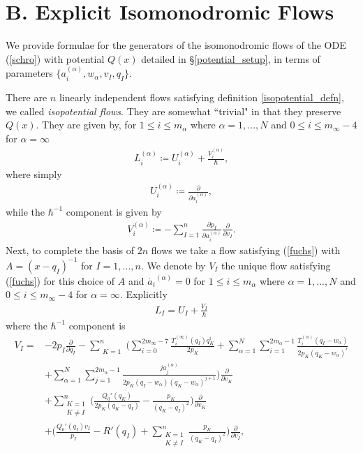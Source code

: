 \documentclass[a4paper,12pt,reqno]{amsart}
\numberwithin{equation}{section}
\numberwithin{counter2}{section}
\begin{document}
\section{B.  Explicit Isomonodromic Flows} \label{explicit_flows}
We provide formulae for the generators of the isomonodromic flows of the ODE (\ref{schro}) with potential $Q(x)$ detailed in \S \ref{potential_setup},  in terms of parameters $\{a_i^{(\alpha)},w_\alpha,  v_I,  q_{I}\}$.  \par
There are $n$ linearly independent flows satisfying definition \ref{isopotential_defn},  we called \textit{isopotential flows}.  They are somewhat ``trivial" in that they preserve $Q(x)$.  They are given by,  for $1 \le i \le m_\alpha$ where $\alpha = 1,...,N$ and $0 \le i \le m_\infty - 4$ for $\alpha = \infty$
\begin{align}
L_{i}^{(\alpha)} \coloneqq U_{i}^{(\alpha)} + \frac{V_{i}^{(\alpha)}}{\hbar},  
\end{align}
where simply
\begin{align}
U_{i}^{(\alpha)}  \coloneqq \frac{\partial}{\partial a_i^{(\alpha)}},  
\end{align}
while the $\hbar^{-1}$ component is given by 
\begin{align}
V_{i}^{(\alpha)} \coloneqq - \sum_{I=1}^{n} \frac{\partial p_I}{\partial a_i^{(\alpha)}} \frac{\partial}{\partial v_I}.  
\end{align}
Next,  to complete the basis of $2n$ flows we take a flow satisfying (\ref{fuchs}) with $A = (x-q_I)^{-1}$ for $I = 1,...,n$.  We denote by $V_I$ the unique flow satisfying (\ref{fuchs}) for this choice of $A$ and $\dot{a_i}^{(\alpha)}=0$ for $1 \le i \le m_\alpha$ where $\alpha = 1,...,N$ and $0 \le i \le m_\infty - 4$ for $\alpha = \infty$.  Explicitly
\begin{align}
L_I = U_I + \frac{V_I}{\hbar}
\end{align}
where the $\hbar^{-1}$ component is
\begin{align}
V_I = &-2p_I\frac{\partial}{\partial q_I} - \sum_{\substack{K=1}}^n\Bigg( \sum_{i=0}^{2m_\infty-7}\frac{T_i^{(\infty)}(q_I)q_K^i}{2p_K} +  \sum_{\alpha=1}^{N}\sum_{i=1}^{2m_\alpha-1}\frac{T_i^{(\alpha)}(q_I-w_\alpha)}{2p_K(q_K-w_\alpha)^{i}} \nonumber \\ &+  \sum_{\alpha=1}^{N} \sum_{j=1}^{2m_\alpha-1} \frac{ja_{j}^{(\alpha)}}{2p_K(q_I-w_\alpha)(q_K-w_\alpha)^{j+1}} \Bigg)\frac{\partial}{\partial v_K} \\ &+ \sum_{\substack{K=1 \\ K \ne I}}^n \Bigg(\frac{Q_0'(q_K)}{2p_K(q_K-q_I)}-\frac{p_K}{(q_K-q_I)^2}\Bigg)\frac{\partial}{\partial v_K} \nonumber \\ &+ \Bigg( \frac{Q_0'(q_I)v_I}{p_I} - R'(q_I)+ \sum_{\substack{K=1 \\ K \ne I}}^n\frac{p_K}{(q_K-q_I)^2} \Bigg)\frac{\partial}{\partial v_I},
\end{align}
\end{document}
